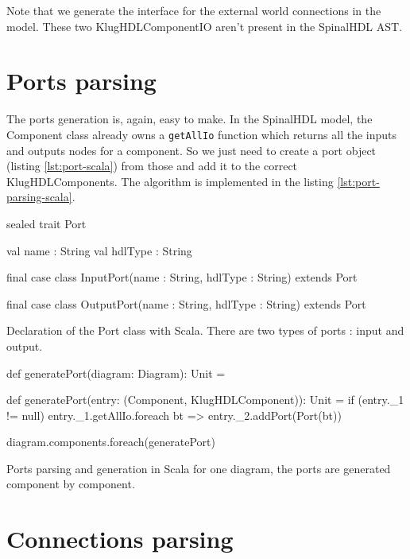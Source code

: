 Note that we generate the interface for the external world connections in the
model. These two KlugHDLComponentIO aren't present in the SpinalHDL AST.

\section{Ports parsing}
\label{sec:ports-parsing}

The ports generation is, again, easy to make. In the SpinalHDL model, the
Component class already owns a \verb|getAllIo| function which returns all the
inputs and outputs nodes for a component. So we just need to create a port
object (listing \ref{lst:port-scala}) from those and add it to the correct
KlugHDLComponents. The algorithm is implemented in the listing
\ref{lst:port-parsing-scala}.

\begin{listing}[H]
  \centering
  \begin{scalacode}
  sealed trait Port {

    val name : String
    val hdlType : String
  }

  final case class InputPort(name : String, hdlType : String) extends Port

  final case class OutputPort(name : String, hdlType : String) extends Port
  \end{scalacode}
  \caption[Diagram class declaration]{Declaration of the Port class with Scala.
There are two types of ports : input and output.}
  \label{lst:port-scala}
\end{listing}

\begin{listing}[H]
  \centering
  \begin{scalacode}
  def generatePort(diagram: Diagram): Unit = {
    def generatePort(entry: (Component, KlugHDLComponent)): Unit = {
      if (entry._1 != null) {
        entry._1.getAllIo.foreach { bt =>
          entry._2.addPort(Port(bt))
        }
      }
    }

    diagram.components.foreach(generatePort)
  }
  \end{scalacode}
  \caption[Implementation of the ports parsing]{Ports parsing and generation in
    Scala for one diagram, the ports are generated component by component.}
  \label{lst:port-parsing-scala}
\end{listing}

\section{Connections parsing}
\label{sec:connections-parsing}

